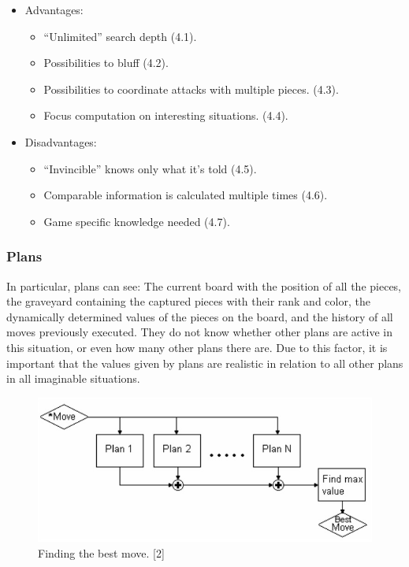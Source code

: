 \documentclass{article}
\begin{document}
\begin{itemize}
  \item Advantages:
  \begin{itemize}
    \item “Unlimited” search depth (4.1).
    \item Possibilities to bluff (4.2).
    \item Possibilities to coordinate attacks with multiple pieces. (4.3).
    \item Focus computation on interesting situations. (4.4).
  \end{itemize}
  \item Disadvantages:
  \begin{itemize}
    \item “Invincible” knows only what it’s told (4.5).
    \item Comparable information is calculated multiple times (4.6).
    \item Game specific knowledge needed (4.7).
  \end{itemize}
\end{itemize}

\subsubsection{Plans}

In particular, plans can see: The current board with the position of all the pieces, the graveyard containing the captured pieces with their rank and color, 
the dynamically determined values of the pieces on the board, and the history of all moves previously executed. 
They do not know whether other plans are active in this situation, or even how many other plans there are. 
Due to this factor, it is important that the values given by plans are realistic in relation to all other plans in all imaginable situations.

\begin{figure}
  \includegraphics[scale=0.5]{plan.jpg}
  \caption{Finding the best move. [2]}
  \label{fig:plans1}
\end{figure}
\end{document}
